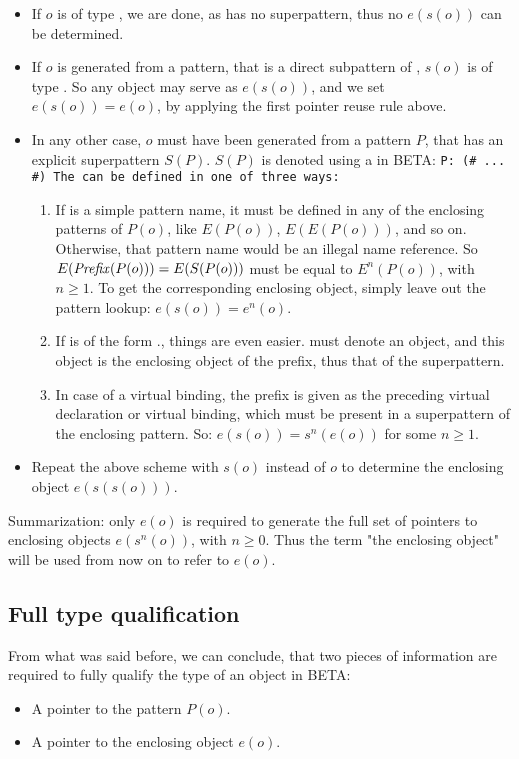 \begin{itemize}
\item If $o$ is of type , we are done, as 
    has no superpattern, thus no $e(s(o))$ can be determined.
\item If $o$ is generated from a pattern, that is a direct
    subpattern of , $s(o)$ is of type .  So
    any object may serve as $e(s(o))$, and we set $e(s(o)) =
    e(o)$, by applying the first pointer reuse rule above.
\item In any other case, $o$ must have been generated from a
    pattern $P$, that has an explicit superpattern $S(P)$.
    $S(P)$ is denoted using a  in BETA:
    \beq\tt P:  (\# ... \#)
    \eeq
    The  can be defined in one of three ways:
    \begin{enumerate}
    \item If  is a simple pattern name, it must be
	defined in any of the enclosing patterns of $P(o)$, like
	$E(P(o))$, $E(E(P(o)))$, and so on.  Otherwise, that
	pattern name would be an illegal name reference.  So
	$E(\mbox{{\em Prefix\/\em}}(P(o))) = E(S(P(o)))$ must be equal
	to $E^n(P(o))$, with $n \ge 1$.  To get the corresponding
	enclosing object, simply leave out the pattern lookup:
	$e(s(o)) = e^n(o)$.
    \item If  is of the form
	., things are
	even easier.   must denote an
	object, and this object is the enclosing object of the
	prefix, thus that of the superpattern.
    \item In case of a virtual binding, the prefix is given as
        the preceding virtual declaration or virtual binding,
	which must be present in a superpattern of the enclosing
	pattern.  So: $e(s(o)) = s^n(e(o))$ for some $n \ge 1$.
    \end{enumerate}
\item Repeat the above scheme with $s(o)$ instead of $o$ to
    determine the enclosing object $e(s(s(o)))$.
\end{itemize}
Summarization: only $e(o)$ is required to generate the full set
of pointers to enclosing objects $e(s^n(o))$, with $n \ge 0$.
Thus the term "the enclosing object" will be used from now on to
refer to $e(o)$.

\subsection{Full type qualification}
From what was said before, we can conclude, that two pieces of
information are required to fully qualify the type of an object
in BETA:
\begin{itemize}
\item A pointer to the pattern $P(o)$.
\item A pointer to the enclosing object $e(o)$.
\end{itemize}

